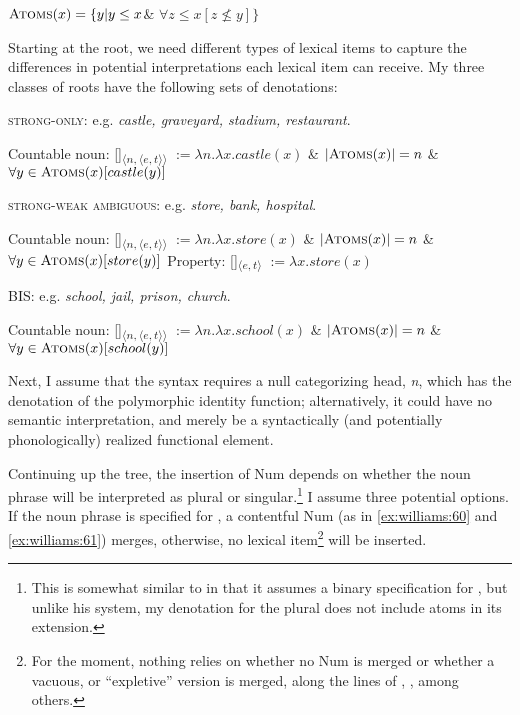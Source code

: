\documentclass[output=paper,
modfonts
]{langscibook}
\begin{document}
\begin{exe}
	\ex $\textsc{Atoms}(x) = \{ y| y \leq x$\& $\forall z \leq x [ z \nleq  y ] \} $ \citep{Ouwayda2014}
\end{exe}

Starting at the root, we need different types of lexical items to capture the differences in potential interpretations each lexical item can receive. My three classes of roots have the following sets of denotations:

\begin{exe}
\ex \textsc{strong-only}: e.g. \textit{castle, graveyard, stadium, restaurant}.
	\begin{xlist}
	\ex Countable noun: [\!]\textsubscript{$\langle n, \langle e,t \rangle \rangle$}  $:= \lambda n.\lambda x. castle(x)$ \& $ \left|\textsc{Atoms}(x)\right| = n $ \& $ \forall y \in \textsc{Atoms}(x)[ castle(y) ]$
    \end{xlist}
\ex \textsc{strong-weak ambiguous}: e.g. \textit{store, bank, hospital}.
    \begin{xlist}
    \ex Countable noun: [\!]\textsubscript{$\langle n, \langle e,t \rangle \rangle$}  $:= \lambda n.\lambda x. store(x)$ \& $ \left|\textsc{Atoms}(x)\right| = n $ \& $ \forall y \in \textsc{Atoms}(x)[ store(y) ]$
	\ex Property: [\!]\textsubscript{$\langle e,t \rangle$}  $:= \lambda x. store(x)$ 
    \end{xlist}
\ex \textsc{BIS}: e.g. \textit{school, jail, prison, church}.
    \begin{xlist}
		\ex Countable noun: [\!]\textsubscript{$\langle n, \langle e,t \rangle \rangle$}  $:= \lambda n.\lambda x. school(x)$ \& $ \left|\textsc{Atoms}(x)\right| = n $ \& $ \forall y \in \textsc{Atoms}(x)[ school(y) ]$
		\label{ex:williams:58}
    \end{xlist}
	\end{exe}

Next, I assume that the syntax requires a null categorizing head, \textit{n}, which has the denotation of the polymorphic identity function; alternatively, it could have no semantic interpretation, and merely be a syntactically (and potentially phonologically) realized functional element. 

Continuing up the tree, the insertion of Num depends on whether the noun phrase will be interpreted as plural or singular.\footnote{This is somewhat similar to \citet{sauerland2003} in that it assumes a binary specification for , but unlike his system, my denotation for the plural does not include atoms in its extension.} I assume three potential options. If the noun phrase is specified for , a contentful Num (as in \ref{ex:williams:60} and \ref{ex:williams:61}) merges, otherwise, no lexical item\footnote{For the moment, nothing relies on whether no Num is merged or whether a vacuous, or ``expletive'' version is merged, along the lines of \citet{Wood2012}, \citet{myler2014}, among others.} will be inserted.
\end{document}
